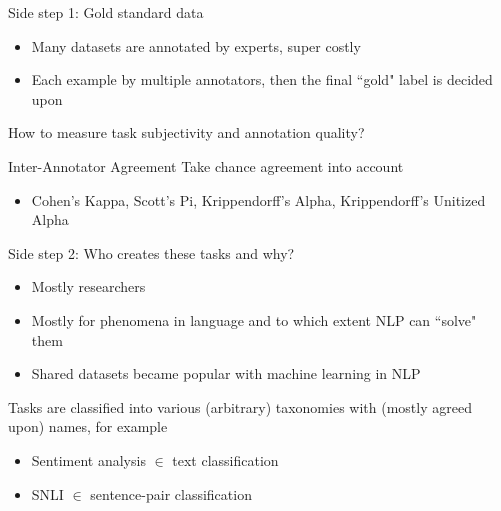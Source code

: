 \documentclass[12pt,aspectratio=169,handout]{beamer}
\begin{document}
\begin{frame}{Side step 1: Gold standard data}

\begin{itemize}
	\item Many datasets are annotated by experts, super costly
	\item Each example by multiple annotators, then the final ``gold" label is decided upon
\end{itemize}

\bigskip

How to measure task subjectivity and annotation quality?

\begin{block}{Inter-Annotator Agreement}
Take chance agreement into account
\begin{itemize}
	\item Cohen's Kappa, Scott's Pi, Krippendorff's Alpha, Krippendorff's Unitized Alpha \citep{Artstein.Poesio.2008.CoLi}
\end{itemize}
	
\end{block}


\end{frame}



\begin{frame}{ Side step 2: Who creates these tasks and why?}

\begin{itemize}
	\item Mostly researchers
	\item Mostly for phenomena in language and to which extent NLP can ``solve" them
	\item Shared datasets became popular with machine learning in NLP
\end{itemize}

Tasks are classified into various (arbitrary) taxonomies with (mostly agreed upon) names, for example

\begin{itemize}
	\item Sentiment analysis $\in$ text classification
	\item SNLI $\in$ sentence-pair classification
\end{itemize}


\end{frame}
\end{document}
